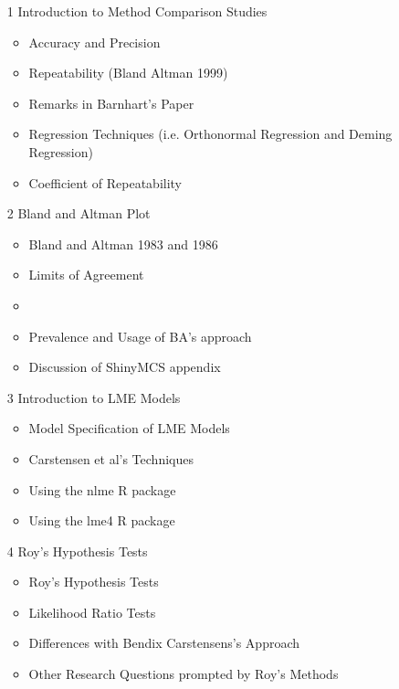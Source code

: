 \documentclass{report}
\begin{document}
\tableofcontents
\newpage
\begin{itemize}		
	
	\item[1]	Introduction to Method Comparison Studies	
	\begin{itemize}	
		\item	Accuracy and Precision
		\item	Repeatability (Bland Altman 1999)
		\item	Remarks in Barnhart's Paper
		\item	Regression Techniques (i.e. Orthonormal Regression and Deming Regression)
	    \item   Coefficient of Repeatability
	\end{itemize}	
	
	
	\item[2]	Bland and Altman Plot	
	\begin{itemize}	
		\item	Bland and Altman 1983 and 1986
		\item	Limits of Agreement
		\item	
		\item   Prevalence and Usage of BA's approach
		\item   Discussion of ShinyMCS appendix
	\end{itemize}
	
	\item[3]	Introduction to LME Models	
	\begin{itemize}	
		\item	Model Specification of LME Models
		\item	Carstensen et al's Techniques
		\item	Using the nlme R package
		\item   Using the lme4 R package
	\end{itemize}
	
	
	\item[4]	Roy's Hypothesis Tests	
	\begin{itemize}	
		\item	Roy's Hypothesis Tests
	    \item   Likelihood Ratio Tests
		\item	Differences with Bendix Carstensens's Approach
		\item	Other Research Questions prompted by Roy's Methods
	\end{itemize}		
	

\end{itemize}
\end{document}
